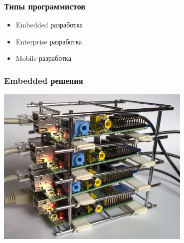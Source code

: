 \documentclass[10pt,pdf,hyperref={unicode}]{beamer}
\begin{document}
\begin{frame}
	\frametitle{ Типы программистов }
		\begin{itemize}
			\item Embedded разработка
			\item Enterprise разработка
			\item Mobile разработка
		\end{itemize}		
\end{frame}


\begin{frame}
\frametitle{ Embedded решения }
	\center
		\includegraphics[width=0.7\textwidth]{./rasbery.png}
\end{frame}
\end{document}
